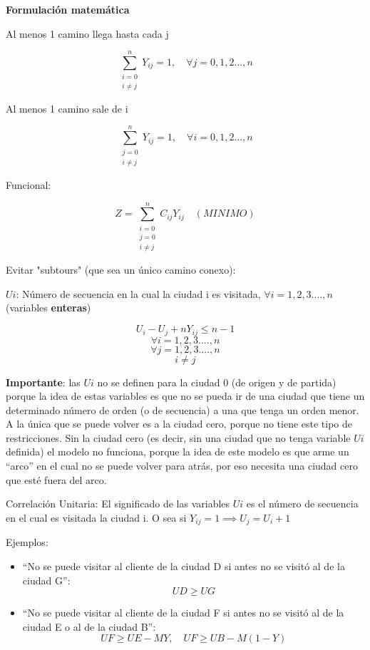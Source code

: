 \documentclass[titlepage,a4paper]{article}
\begin{document}
\textbf{Formulación matemática}

Al menos 1 camino llega hasta cada j

$$ \sum_{\substack{i=0 \\ i \neq j}}^{n} Y_{ij} = 1 ,\quad \forall j = 0 ,1 ,2 ...,n $$

Al menos 1 camino sale de i

$$ \sum_{\substack{j=0 \\ i \neq j}}^{n} Y_{ij} = 1,\quad \forall i = 0 ,1 ,2 ...,n $$


Funcional: 

$$ Z = \sum_{\substack{i=0 \\ j=0 \\ i \neq j}}^{n} C_{ij} Y_{ij} \quad (MINIMO) $$

Evitar "subtours" (que sea un único camino conexo):

\vspace{0.25cm}

$Ui$: Número de secuencia en la cual la ciudad i es visitada,  $\forall i = 1 ,2 ,3 .... ,n $ (variables \textbf{enteras})

$$ U_{i} - U_{j} + n Y_{ij} \leq n - 1 $$
$$ \forall i = 1 ,2 ,3 .... ,n $$
$$ \forall j = 1 ,2 ,3 .... ,n $$
$$ i \neq j $$

\textbf{Importante}:  las $Ui$ no se definen para la ciudad 0 (de origen y de partida) porque la idea de estas variables es que no se pueda ir de una ciudad que tiene un determinado número de orden (o de secuencia) a
una que tenga un orden menor. A la única que se puede volver es a la ciudad cero, porque no tiene este tipo de restricciones. Sin la ciudad cero (es decir, sin una ciudad que no tenga variable $Ui$ definida) el modelo no
funciona, porque la idea de este modelo es que arme un “arco” en el cual no se puede volver para atrás, por eso necesita una ciudad cero que esté fuera del arco.

Correlación Unitaria: El significado de las variables $Ui$ es el número de
secuencia en el cual es visitada la ciudad i. O sea si $Y_{ij} = 1 \implies U_{j} = U_{i} + 1$

Ejemplos: 
\begin{itemize}
    \item “No se puede visitar al cliente de la ciudad D si antes no se visitó al de la ciudad G”: $$UD \geq UG$$
    \item “No se puede visitar al cliente de la ciudad F si antes no se visitó al de la ciudad E o al de la ciudad B”: $$UF \geq UE - MY , \quad UF \geq UB - M (1 - Y)$$
\end{itemize}
\end{document}
